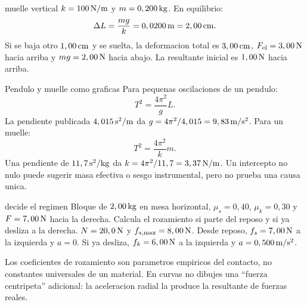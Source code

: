 \documentclass[10pt,a4paper]{article}
\begin{document}
\begin{examplebox}{muelle vertical}
$k=100\,\mathrm{N/m}$ y $m=0,200\,\mathrm{kg}$. En equilibrio:
\[
\Delta L=\frac{mg}{k}=0,0200\,\mathrm{m}=2,00\,\mathrm{cm}.
\]
Si se baja otro $1,00\,\mathrm{cm}$ y se suelta, la deformacion total es $3,00\,\mathrm{cm}$, $F_{\mathrm{el}}=3,00\,\mathrm{N}$ hacia arriba y $mg=2,00\,\mathrm{N}$ hacia abajo. La resultante inicial es $1,00\,\mathrm{N}$ hacia arriba.
\end{examplebox}

\clearpage

\begin{lessoncard}{Pendulo y muelle como graficas}
Para pequenas oscilaciones de un pendulo:
\[
T^2=\frac{4\pi^2}{g}L.
\]
La pendiente publicada $4,015\,\mathrm{s^2/m}$ da $g=4\pi^2/4,015=9,83\,\mathrm{m/s^2}$. Para un muelle:
\[
T^2=\frac{4\pi^2}{k}m.
\]
Una pendiente de $11,7\,\mathrm{s^2/kg}$ da $k=4\pi^2/11,7=3,37\,\mathrm{N/m}$. Un intercepto no nulo puede sugerir masa efectiva o sesgo instrumental, pero no prueba una causa unica.
\end{lessoncard}

\begin{exercisebox}{decide el regimen}
Bloque de $2,00\,\mathrm{kg}$ en mesa horizontal, $\mu_s=0,40$, $\mu_k=0,30$ y $F=7,00\,\mathrm{N}$ hacia la derecha. Calcula el rozamiento si parte del reposo y si ya desliza a la derecha.
\solutionblock $N=20,0\,\mathrm{N}$ y $f_{s,\max}=8,00\,\mathrm{N}$. Desde reposo, $f_s=7,00\,\mathrm{N}$ a la izquierda y $a=0$. Si ya desliza, $f_k=6,00\,\mathrm{N}$ a la izquierda y $a=0,500\,\mathrm{m/s^2}$.
\end{exercisebox}

\begin{warnbox}
Los coeficientes de rozamiento son parametros empiricos del contacto, no constantes universales de un material. En curvas no dibujes una ``fuerza centripeta'' adicional: la aceleracion radial la produce la resultante de fuerzas reales.
\end{warnbox}
\end{document}
